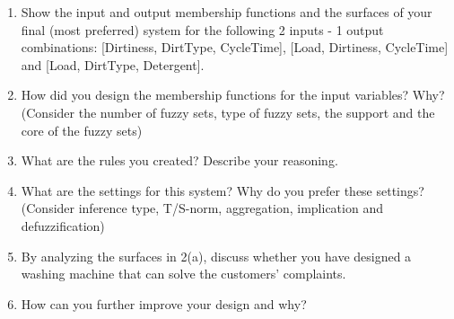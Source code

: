 \documentclass[11pt]{article}
\begin{document}
\begin{enumerate}[label=(\alph*)]

  \item Show the input and output membership functions and the surfaces of your ﬁnal (most preferred) system for the following 2 inputs - 1 output combinations: [Dirtiness, DirtType, CycleTime], [Load, Dirtiness, CycleTime] and [Load, DirtType, Detergent].

  \item How did you design the membership functions for the input variables? Why? (Consider the number of fuzzy sets, type of fuzzy sets, the support and the core of the fuzzy sets)

  \item What are the rules you created? Describe your reasoning.

  \item What are the settings for this system? Why do you prefer these settings? (Consider inference type, T/S-norm, aggregation, implication and defuzziﬁcation)

  \item By analyzing the surfaces in 2(a), discuss whether you have designed a washing machine that can solve the customers’ complaints.

  \item How can you further improve your design and why?

\end{enumerate}


\end{document}
